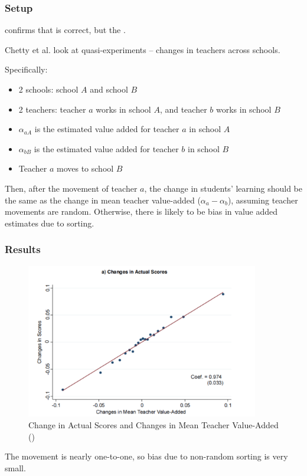         \subsubsection{Setup}
            \cite{chetty_measuring_2014-1} confirms that \cite{rothstein_teacher_2010} is correct, but the .
    
            Chetty et al. look at quasi-experiments -- changes in teachers across schools.
    
            Specifically:
            \begin{itemize}
                \item 2 schools: school $A$ and school $B$
                \item 2 teachers: teacher $a$ works in school $A$, and teacher $b$ works in school $B$
                \item $\alpha_{aA}$ is the estimated value added for teacher $a$ in school $A$
                \item $\alpha_{bB}$ is the estimated value added for teacher $b$ in school $B$
                \item Teacher $a$ moves to school $B$
            \end{itemize}
            Then, after the movement of teacher $a$, the change in students' learning should be the same as the change in mean teacher value-added ($\alpha _{a}-\alpha_{b}$), assuming teacher movements are random. Otherwise, there is likely to be bias in value added estimates due to sorting.

        \subsubsection{Results}
            \begin{figure}[H]
                \centering
                \includegraphics[width=4in]{images/ch9/9 chetty 2014.png}
                \caption{Change in Actual Scores and Changes in Mean Teacher Value-Added (\cite{chetty_measuring_2014})}
            \end{figure}
            The movement is nearly one-to-one, so bias due to non-random sorting is very small.

